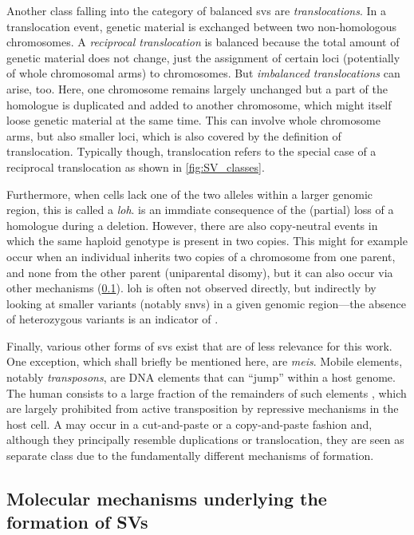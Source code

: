 Another class falling into the category of balanced \acp{sv} are
\emph{translocations}. In a translocation event, genetic
material is exchanged between two non-homologous chromosomes. A \emph{reciprocal
translocation} is balanced because the total amount of genetic material does
not change, just the assignment of certain loci (potentially of whole chromosomal arms)
to chromosomes.
But \emph{imbalanced translocations} can arise, too. Here, one chromosome remains
largely unchanged but a part of the homologue is duplicated and added to another
chromosome, which might itself loose genetic material at the same time. This can
involve whole chromosome arms, but also smaller loci, which is also covered by
the definition of translocation. Typically though, translocation refers to the
special case of a reciprocal translocation as shown in \cref{fig:SV_classes}.

Furthermore, when cells lack one of the two alleles within a larger genomic region,
this is called a \emph{\acf{loh}}. \loh is an immdiate consequence of the
(partial) loss of a homologue during a deletion.
However, there are also copy-neutral \loh events in which the same haploid
genotype is present in two copies. This might for example occur when an
individual inherits two copies of a chromosome from one parent, and none from the
other parent (uniparental disomy), but it can also occur via other mechanisms
(\cref{sec:mechanisms}). \Ac{loh} is often not observed directly, but indirectly
by looking at smaller variants (notably \acp{snv}) in a given genomic
region---the absence of heterozygous variants is an indicator of \loh.

Finally, various other forms of \acp{sv} exist that are of less relevance for
this work. One exception, which shall briefly be mentioned here, are
\emph{\acfp{mei}}. Mobile elements, notably \emph{transposons}, are DNA elements
that can ``jump'' within a host genome. The human consists to a large fraction of
the remainders of such elements \citep{Haubold2006}, which are largely
prohibited from active transposition by repressive mechanisms in the host cell.
A \mei may occur in a cut-and-paste or a copy-and-paste fashion and, although
they principally resemble duplications or translocation, they are seen as
separate class due to the fundamentally different mechanisms of formation.





\subsection{Molecular mechanisms underlying the formation of SVs}
\label{sec:mechanisms}

